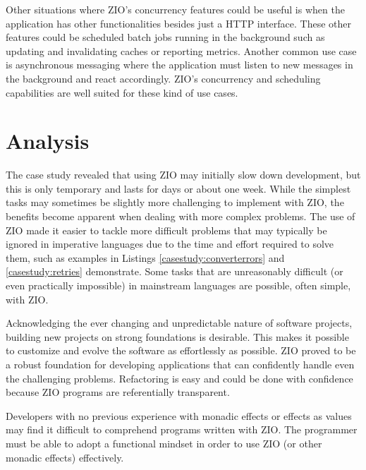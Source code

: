 Other situations where ZIO's concurrency features could be useful is when the application has other functionalities besides just a HTTP interface. These other features could be scheduled batch jobs running in the background such as updating and invalidating caches or reporting metrics. Another common use case is asynchronous messaging where the application must listen to new messages in the background and react accordingly. ZIO's concurrency and scheduling capabilities are well suited for these kind of use cases.


\section{Analysis}
The case study revealed that using ZIO may initially slow down development, but this is only temporary and lasts for days or about one week. While the simplest tasks may sometimes be slightly more challenging to implement with ZIO, the benefits become apparent when dealing with more complex problems. The use of ZIO made it easier to tackle more difficult problems that may typically be ignored in imperative languages due to the time and effort required to solve them, such as examples in Listings \ref{casestudy:converterrors} and \ref{casestudy:retries} demonstrate. Some tasks that are unreasonably difficult (or even practically impossible) in mainstream languages are possible, often simple, with ZIO.

Acknowledging the ever changing and unpredictable nature of software projects, building new projects on strong foundations is desirable. This makes it possible to customize and evolve the software as effortlessly as possible. ZIO proved to be a robust foundation for developing applications that can confidently handle even the challenging problems. Refactoring is easy and could be done with confidence because ZIO programs are referentially transparent.

Developers with no previous experience with monadic effects or effects as values may find it difficult to comprehend programs written with ZIO. The programmer must be able to adopt a functional mindset in order to use ZIO (or other monadic effects) effectively.
    
